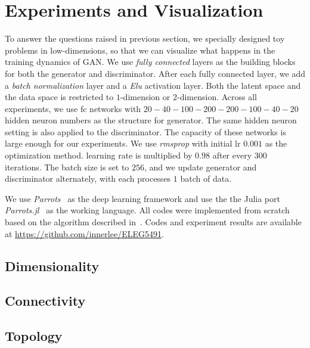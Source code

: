 \section{Experiments and Visualization} \label{sec:exp}

To answer the questions raised in previous section,
we specially designed toy problems in low-dimensions,
so that we can visualize what happens in the training dynamics of GAN.
We use \emph{fully connected} layers as the building blocks for both
the generator and discriminator.
After each fully connected layer,
we add a \emph{batch normalization} layer and a \emph{Elu} activation layer.
Both the latent space and the data space is
restricted to $1$-dimension or $2$-dimension.
Across all experiments,
we use fc networks with
$20-40-100-200-200-100-40-20$ hidden neuron numbers
as the structure for generator.
The same hidden neuron setting is also applied to the discriminator.
The capacity of these networks is large enough for our experiments.
We use \emph{rmsprop} with initial lr $0.001$ as the optimization method.
learning rate is multiplied by $0.98$ after every $300$ iterations.
The batch size is set to $256$,
and we update generator and discriminator alternately,
with each processes $1$ batch of data.

We use \emph{Parrots}~\cite{parrots} as the deep learning framework
and use the the Julia port \emph{Parrots.jl}~\cite{parrotsjl}
as the working language.
All codes were implemented from scratch based on
the algorithm described in~\cite{goodfellow2014generative}.
Codes and experiment results are available at
\url{https://github.com/innerlee/ELEG5491}.

\subsection{Dimensionality}

\subsection{Connectivity}

\subsection{Topology}
